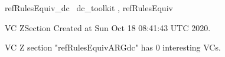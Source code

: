 \documentclass{article}
\begin{document}

\begin{zsection}	 \SECTION refRulesEquiv\_dc \parents~dc\_toolkit , refRulesEquiv
\end{zsection}

\newcommand{\appliesTo}{\zbinop{appliesTo}} 
\newcommand{\appliesToNofix}{\zpreop{appliesToNofix}} 

VC ZSection Created at Sun Oct 18 08:41:43 UTC 2020.



 VC Z section "refRulesEquivARGdc" has $0$ interesting VCs.



\end{document}
